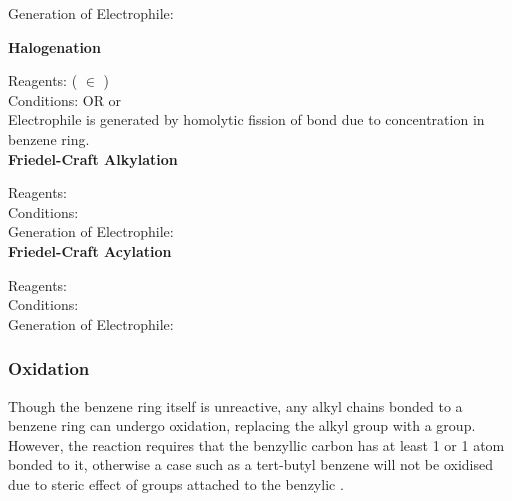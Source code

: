 \documentclass[../main]{subfiles}
\begin{document}
	Generation of Electrophile:  



	\noindent \textbf{Halogenation}

	Reagents:  ( \(\in\) ) \\
	Conditions:  OR  or  \\

	Electrophile is generated by homolytic fission of  bond due to  concentration in benzene ring. \\

	\noindent \textbf{Friedel-Craft Alkylation}

	Reagents:  \\
	Conditions:  \\

	Generation of Electrophile:  \\

	\noindent \textbf{Friedel-Craft Acylation}

	Reagents:  \\
	Conditions:  \\

	Generation of Electrophile:  \\

	\subsubsection{Oxidation}

	Though the benzene ring itself is unreactive, any alkyl chains bonded to a benzene ring can undergo oxidation, replacing the alkyl group with a  group. However, the reaction requires that the benzyllic carbon has at least 1  or 1  atom bonded to it, otherwise a case such as a tert-butyl benzene will not be oxidised due to steric effect of  groups attached to the benzylic .
\end{document}
